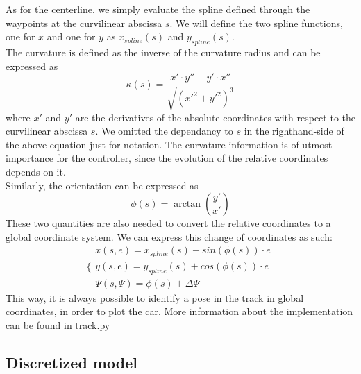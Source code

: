 \documentclass[a4paper, onecolumn, 12pt]{article}
\begin{document}
As for the centerline, we simply evaluate the spline defined through the
waypoints at the curvilinear abscissa $s$. We will define the two spline
functions, one for $x$ and one for $y$ as $x_{spline}(s)$ and $y_{spline}(s)$.\\
The curvature is defined as the inverse of the curvature radius and can be
expressed as
\begin{equation}
    \kappa(s) = \frac{x' \cdot y'' - y' \cdot x''}{\sqrt{(x'^2 + y'^2)^3}}
\end{equation}
where $x'$ and $y'$ are the derivatives of the absolute coordinates with respect
to the curvilinear abscissa $s$. We omitted the dependancy to $s$ in the
righthand-side of the above equation just for notation. The curvature
information is of utmost importance for the controller, since the evolution of
the relative coordinates depends on it. \\
Similarly, the orientation can be expressed as
\begin{equation}
    \phi(s) = \arctan\left(\frac{y'}{x'}\right)
\end{equation}
These two quantities are also needed to convert the relative coordinates to a
global coordinate system. We can express this change of coordinates as such:
\begin{equation}
    \Bigg\{
        \begin{array}{ll}
            x(s,e) =  x_{spline}(s) - sin(\phi(s)) \cdot e\\
            y(s,e) =  y_{spline}(s) + cos(\phi(s)) \cdot e\\
            \varPsi(s,\varPsi) = \phi(s) + \Delta \varPsi
        \end{array}
\end{equation}
This way, it is always possible to identify a pose in the track in global
coordinates, in order to plot the car. More information about the implementation
can be found in
\href{https://github.com/neverorfrog/vehicle-control/blob/main/environment/track.py}{track.py}


\subsection{Discretized model}
\end{document}

